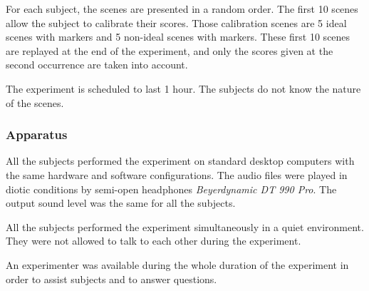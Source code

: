 \documentclass[12pt]{elsarticle}
\begin{document}
For each subject, the scenes are presented in a random order. The first 10 scenes allow the subject to calibrate their scores. Those calibration scenes are 5 ideal scenes with markers and 5 non-ideal scenes with markers. These first 10 scenes are replayed at the end of the experiment, and only the scores given at the second occurrence are taken into account.


The experiment is scheduled to last 1 hour. The subjects do not know the nature of the scenes.

\subsubsection*{Apparatus}


All the subjects performed the experiment on standard desktop computers with the same hardware and software configurations. The audio files were played in diotic conditions by semi-open headphones \emph{Beyerdynamic DT 990 Pro}. The output sound level was the same for all the subjects.


All the subjects performed the experiment simultaneously in a quiet environment. They were not allowed to talk to each other during the experiment.


An experimenter was available during the whole duration of the experiment in order to assist subjects and to answer questions.

\end{document}
